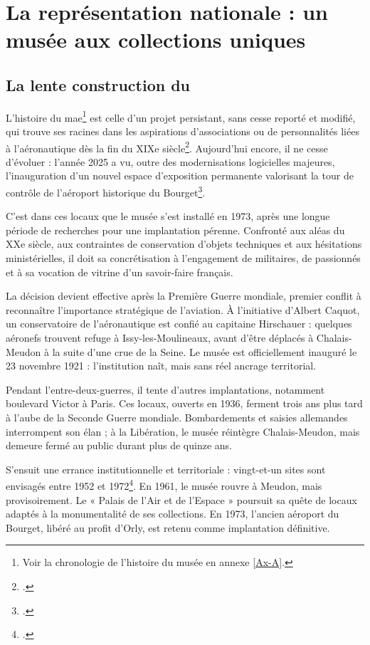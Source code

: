 \section{\label{I-A-1}La représentation nationale : un musée aux collections uniques}

\subsection{La lente construction du \mae}

L'histoire du \acf{mae}\footnote{Voir la chronologie de l'histoire du musée en annexe \ref{Ax-A}.} est celle d'un projet persistant, sans cesse reporté et modifié, qui trouve ses racines dans les aspirations d'associations ou de personnalités liées à l'aéronautique dès la fin du XIXe siècle\footcite{terrierAeroportParisBourget2019}. Aujourd'hui encore, il ne cesse d'évoluer : l'année 2025 a vu, outre des modernisations logicielles majeures, l'inauguration d'un nouvel espace d'exposition permanente valorisant la tour de contrôle de l'aéroport historique du Bourget\footcite{museedelairetdelespaceHallNavigationAerienne2025}.

C'est dans ces locaux que le musée s'est installé en 1973, après une longue période de recherches pour une implantation pérenne. Confronté aux aléas du XXe siècle, aux contraintes de conservation d'objets techniques et aux hésitations ministérielles, il doit sa concrétisation à l'engagement de militaires, de passionnés et à sa vocation de vitrine d'un savoir-faire français.

La décision devient effective après la Première Guerre mondiale, premier conflit à reconnaître l'importance stratégique de l'aviation. À l'initiative d'Albert Caquot, un conservatoire de l'aéronautique est confié au capitaine Hirschauer : quelques aéronefs trouvent refuge à Issy-les-Moulineaux, avant d'être déplacés à Chalais-Meudon à la suite d'une crue de la Seine. Le musée est officiellement inauguré le 23 novembre 1921 : l'institution naît, mais sans réel ancrage territorial.

Pendant l'entre-deux-guerres, il tente d'autres implantations, notamment boulevard Victor à Paris. Ces locaux, ouverts en 1936, ferment trois ans plus tard à l'aube de la Seconde Guerre mondiale. Bombardements et saisies allemandes interrompent son élan ; à la Libération, le musée réintègre Chalais-Meudon, mais demeure fermé au public durant plus de quinze ans.

S'ensuit une errance institutionnelle et territoriale : vingt-et-un sites sont envisagés entre 1952 et 1972\footcite{terrierAeroportParisBourget2019}. En 1961, le musée rouvre à Meudon, mais provisoirement. Le « Palais de l'Air et de l'Espace » poursuit sa quête de locaux adaptés à la monumentalité de ses collections. En 1973, l'ancien aéroport du Bourget, libéré au profit d'Orly, est retenu comme implantation définitive.

